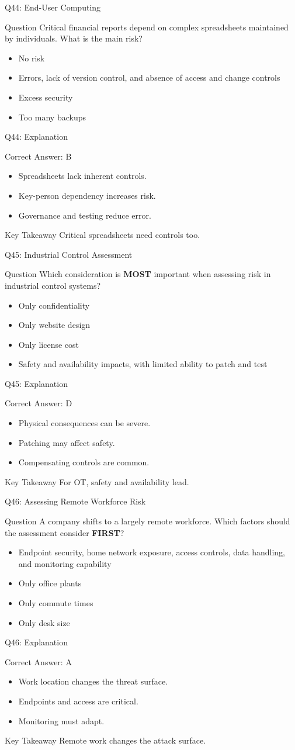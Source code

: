 \documentclass[aspectratio=169]{beamer}
\newcommand{\hq}[7]{%
	\begin{frame}{Q#1: #2}
		\begin{block}{Question}
			#3
		\end{block}
		\begin{itemize}
			#4
		\end{itemize}
	\end{frame}
	\begin{frame}{Q#1: Explanation}
		\begin{block}{Correct Answer: #5}
			\begin{itemize}
				#6
			\end{itemize}
		\end{block}
		\begin{alertblock}{Key Takeaway}
			#7
		\end{alertblock}
	\end{frame}
}
\begin{document}
	\hq{44}{End-User Computing}
	{Critical financial reports depend on complex spreadsheets maintained by individuals. What is the main risk?}
	{\item[\textbf{(A)}] No risk
		\item[\textbf{(B)}] Errors, lack of version control, and absence of access and change controls
		\item[\textbf{(C)}] Excess security
		\item[\textbf{(D)}] Too many backups}
	{B}
	{\item Spreadsheets lack inherent controls.
		\item Key-person dependency increases risk.
		\item Governance and testing reduce error.}
	{Critical spreadsheets need controls too.}

	\hq{45}{Industrial Control Assessment}
	{Which consideration is \textbf{MOST} important when assessing risk in industrial control systems?}
	{\item[\textbf{(A)}] Only confidentiality
		\item[\textbf{(B)}] Only website design
		\item[\textbf{(C)}] Only license cost
		\item[\textbf{(D)}] Safety and availability impacts, with limited ability to patch and test}
	{D}
	{\item Physical consequences can be severe.
		\item Patching may affect safety.
		\item Compensating controls are common.}
	{For OT, safety and availability lead.}

	\hq{46}{Assessing Remote Workforce Risk}
	{A company shifts to a largely remote workforce. Which factors should the assessment consider \textbf{FIRST}?}
	{\item[\textbf{(A)}] Endpoint security, home network exposure, access controls, data handling, and monitoring capability
		\item[\textbf{(B)}] Only office plants
		\item[\textbf{(C)}] Only commute times
		\item[\textbf{(D)}] Only desk size}
	{A}
	{\item Work location changes the threat surface.
		\item Endpoints and access are critical.
		\item Monitoring must adapt.}
	{Remote work changes the attack surface.}

\end{document}
